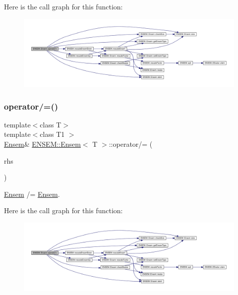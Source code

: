Here is the call graph for this function\+:
\nopagebreak
\begin{figure}[H]
\begin{center}
\leavevmode
\includegraphics[width=350pt]{d7/d3e/classENSEM_1_1Ensem_aa0d7f0d69f4c1c1adc551c91abcf271a_cgraph}
\end{center}
\end{figure}
\mbox{\label{classENSEM_1_1Ensem_aa0d7f0d69f4c1c1adc551c91abcf271a}} 
\subsubsection{\texorpdfstring{operator/=()}{operator/=()}\hspace{0.1cm}{\footnotesize\ttfamily [4/4]}}
{\footnotesize\ttfamily template$<$class T$>$ \\
template$<$class T1 $>$ \\
\mbox{\hyperlink{classENSEM_1_1Ensem}{Ensem}}\& \mbox{\hyperlink{classENSEM_1_1Ensem}{E\+N\+S\+E\+M\+::\+Ensem}}$<$ T $>$\+::operator/= (\begin{DoxyParamCaption}\item[{const \mbox{\hyperlink{classENSEM_1_1Ensem}{Ensem}}$<$ T1 $>$ \&}]{rhs }\end{DoxyParamCaption})\hspace{0.3cm}{\ttfamily [inline]}}



\mbox{\hyperlink{classENSEM_1_1Ensem}{Ensem}} /= \mbox{\hyperlink{classENSEM_1_1Ensem}{Ensem}}. 

Here is the call graph for this function\+:
\nopagebreak
\begin{figure}[H]
\begin{center}
\leavevmode
\includegraphics[width=350pt]{d7/d3e/classENSEM_1_1Ensem_aa0d7f0d69f4c1c1adc551c91abcf271a_cgraph}
\end{center}
\end{figure}
\mbox{\label{classENSEM_1_1Ensem_a9aecabccdc31d9b43db877a82879f702}} 
